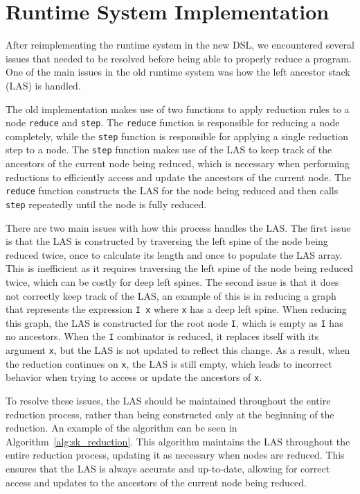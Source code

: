 \section{Runtime System Implementation}
After reimplementing the runtime system in the new DSL, we encountered several issues that needed to be resolved before being able to properly reduce a program. One of the main issues in the old runtime system was how the left ancestor stack (LAS) is handled.

The old implementation makes use of two functions to apply reduction rules to a node \verb|reduce| and \verb|step|. The \verb|reduce| function is responsible for reducing a node completely, while the \verb|step| function is responsible for applying a single reduction step to a node. The \verb|step| function makes use of the LAS to keep track of the ancestors of the current node being reduced, which is necessary when performing reductions to efficiently access and update the ancestors of the current node. The \verb|reduce| function constructs the LAS for the node being reduced and then calls \verb|step| repeatedly until the node is fully reduced.

There are two main issues with how this process handles the LAS. The first issue is that the LAS is constructed by traversing the left spine of the node being reduced twice, once to calculate its length and once to populate the LAS array. This is inefficient as it requires traversing the left spine of the node being reduced twice, which can be costly for deep left spines. The second issue is that it does not correctly keep track of the LAS, an example of this is in reducing a graph that represents the expression \verb|I x| where \verb|x| has a deep left spine. When reducing this graph, the LAS is constructed for the root node \verb|I|, which is empty as \verb|I| has no ancestors. When the \verb|I| combinator is reduced, it replaces itself with its argument \verb|x|, but the LAS is not updated to reflect this change. As a result, when the reduction continues on \verb|x|, the LAS is still empty, which leads to incorrect behavior when trying to access or update the ancestors of \verb|x|. 

To resolve these issues, the LAS should be maintained throughout the entire reduction process, rather than being constructed only at the beginning of the reduction. An example of the algorithm can be seen in Algorithm~\ref{alg:sk_reduction}. This algorithm maintains the LAS throughout the entire reduction process, updating it as necessary when nodes are reduced. This ensures that the LAS is always accurate and up-to-date, allowing for correct access and updates to the ancestors of the current node being reduced.

